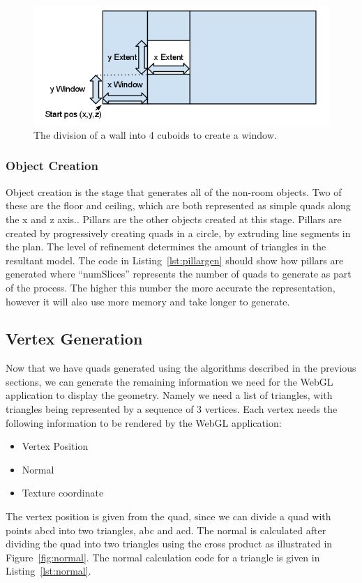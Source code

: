 \begin{figure}
  \centering
  \includegraphics[width=1.0\textwidth]{images/WindowExtrusion}
  \caption{The division of a wall into 4 cuboids to create a window.}
  \label{fig:extrudewindow}
\end{figure}

\subsubsection{Object Creation}
Object creation is the stage that generates all of the non-room objects.
Two of these are the floor and ceiling, which are both represented as simple quads along the x and z axis..
Pillars are the other objects created at this stage.
Pillars are created by progressively creating quads in a circle, by extruding line segments in the plan.
The level of refinement determines the amount of triangles in the resultant model.
The code in Listing~\ref{lst:pillargen} should show how pillars are generated where ``numSlices'' represents the number of quads to generate as part of the process.
The higher this number the more accurate the representation, however it will also use more memory and take longer to generate.



\subsection{Vertex Generation}
Now that we have quads generated using the algorithms described in the previous sections, we can generate the remaining information we need for the WebGL application to display the geometry.
Namely we need a list of triangles, with triangles being represented by a sequence of 3 vertices.
Each vertex needs the following information to be rendered by the WebGL application:
\begin{itemize}
	\item Vertex Position
	\item Normal
	\item Texture coordinate
\end{itemize}
The vertex position is given from the quad, since we can divide a quad with points abcd into two triangles, abc and acd.
The normal is calculated after dividing the quad into two triangles using the cross product as illustrated in Figure~\ref{fig:normal}.
The normal calculation code for a triangle is given in Listing~\ref{lst:normal}.

